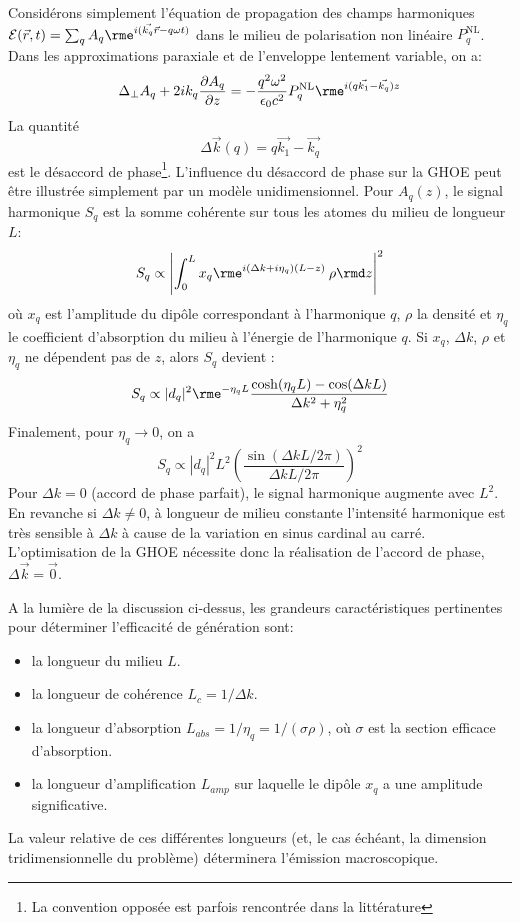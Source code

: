 Considérons simplement l'équation de propagation des champs harmoniques $\mathcal{E}(\vec{r},t) = \sum_q A_q \rme^{i(\vec{k_q} \vec{r} - q\omega t)}$ dans le milieu de polarisation non linéaire $P_q^{\text{NL}}$. Dans les approximations paraxiale et de l'enveloppe lentement variable, on a:
\begin{equation}
\Delta_\bot A_q + 2 i k_q \frac{\partial A_q}{\partial z}= -\frac{q^2 \omega^2}{\epsilon_0 c^2} P_q^{\text{NL}} \rme^{i(q \vec{k_1} - \vec{k_q})z}
\end{equation} 
La quantité
\begin{equation}
\Delta \vec{k} (q) = q \vec{k_1} - \vec{k_q}
\end{equation}
est le désaccord de phase\footnote{La convention opposée est parfois rencontrée dans la littérature}. L'influence du désaccord de phase sur la GHOE peut être illustrée simplement par un modèle unidimensionnel. Pour $A_q(z)$, le signal harmonique $S_q$ est la somme cohérente sur tous les atomes du milieu de longueur $L$:
\begin{equation}
S_q \propto \left| \int_0^L x_q \rme^{i(\Delta k + i \eta_q)(L-z)} \: \rho \rmd z \right|^2
\end{equation}
où $x_q$ est l'amplitude du dipôle correspondant à l'harmonique $q$, $\rho$ la densité et $\eta_q$ le coefficient d'absorption du milieu à l'énergie de l'harmonique $q$. Si $x_q$, $\Delta k$, $\rho$ et $\eta_q$ ne dépendent pas de $z$, alors $S_q$ devient :
\begin{equation}
S_q \propto |d_q|^2 \rme^{-\eta_q L} \frac{\cosh(\eta_q L) - \cos(\Delta k L)}{\Delta k^2 + \eta_q^2}
\end{equation}
Finalement, pour $\eta_q \rightarrow 0$, on a
\begin{equation}
S_q \propto |d_q|^2 L^2 \left( \frac{\sin(\Delta k L /2\pi)}{\Delta k L /2\pi}\right)^2
\end{equation}
Pour $\Delta k = 0$ (accord de phase parfait), le signal harmonique augmente avec $L^2$. En revanche si $\Delta k \neq 0$, à longueur de milieu constante l'intensité harmonique est très sensible à $\Delta k$ à cause de la variation en sinus cardinal au carré. L'optimisation de la GHOE nécessite donc la réalisation de l'accord de phase, $\Delta \vec{k} = \vec{0}$.

A la lumière de la discussion ci-dessus, les grandeurs caractéristiques pertinentes pour déterminer l'efficacité de génération sont:
\begin{itemize}
\item la longueur du milieu $L$.
\item la longueur de cohérence $L_c = 1/\Delta k$.
\item la longueur d'absorption $L_{abs} = 1/\eta_q = 1/(\sigma \rho)$, où $\sigma$ est la section efficace d'absorption.
\item la longueur d'amplification $L_{amp}$ sur laquelle le dipôle $x_q$ a une amplitude significative.
\end{itemize}
La valeur relative de ces différentes longueurs (et, le cas échéant, la dimension tridimensionnelle du problème) déterminera l'émission macroscopique.


